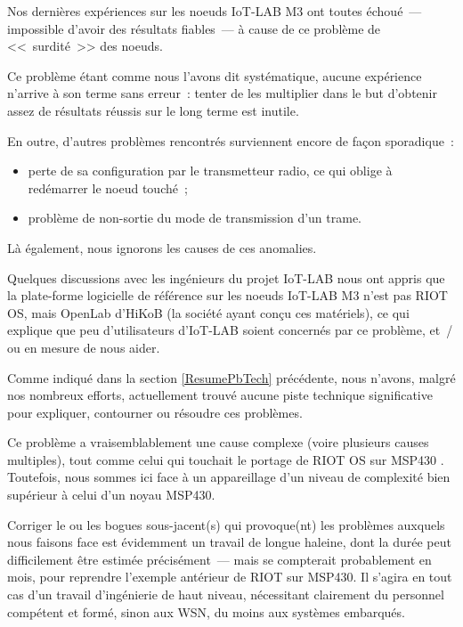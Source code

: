Nos dernières expériences sur les noeuds IoT-LAB M3 ont toutes échoué~---
impossible d'avoir des résultats fiables~--- à cause de ce problème de
<<~surdité~>> des noeuds.

Ce problème étant comme nous l'avons dit systématique, aucune expérience
n'arrive à son terme sans erreur~: tenter de les multiplier dans le but
d'obtenir assez de résultats réussis sur le long terme est inutile.

En outre, d'autres problèmes rencontrés surviennent encore de façon
sporadique~:
\begin{itemize}
\item perte de sa configuration par le transmetteur radio, ce qui oblige
à redémarrer le noeud touché~;
\item problème de non-sortie du mode de transmission d'un trame.
\end{itemize}

Là également, nous ignorons les causes de ces anomalies.

\medskip

Quelques discussions avec les ingénieurs du projet IoT-LAB nous ont appris
que la plate-forme logicielle de référence sur les noeuds IoT-LAB M3 n'est
pas RIOT OS, mais OpenLab d'HiKoB (la société ayant conçu ces matériels),
ce qui explique que peu d'utilisateurs d'IoT-LAB soient concernés par
ce problème, et~/ ou en mesure de nous aider.

\bigskip

Comme indiqué dans la section \ref{ResumePbTech} précédente, nous n'avons,
malgré nos nombreux efforts, actuellement trouvé aucune piste technique
significative pour expliquer, contourner ou résoudre ces problèmes.

Ce problème a vraisemblablement une cause complexe (voire plusieurs causes
multiples), tout comme celui qui touchait le portage de RIOT OS sur MSP430
\cite{PRriotFix1MSP430} \cite{PRriotFix2MSP430} \cite{PRriotFix3MSP430}.
Toutefois, nous sommes ici face à un appareillage d'un niveau de complexité
bien supérieur à celui d'un noyau MSP430.

Corriger le ou les bogues sous-jacent(s) qui provoque(nt) les problèmes
auxquels nous faisons face est évidemment un travail de longue haleine,
dont la durée peut difficilement être estimée précisément~--- mais se
compterait probablement en mois, pour reprendre l'exemple antérieur de RIOT
sur MSP430. Il s'agira en tout cas d'un travail d'ingénierie de haut niveau,
nécessitant clairement du personnel compétent et formé, sinon aux WSN,
du moins aux systèmes embarqués.

